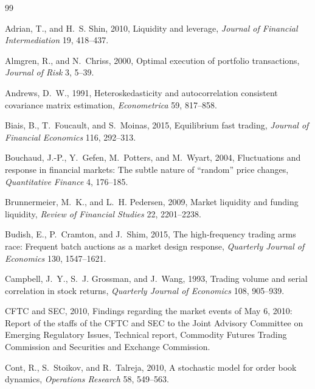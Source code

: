 \documentclass[12pt]{article}
\theoremstyle{definition}
\theoremstyle{remark}
\begin{document}
\begin{thebibliography}{99}
\small
\setlength{\itemsep}{0.0pt plus 0.3pt}
\setlength{\parsep}{0.0pt}

Adrian, T., and H.~S. Shin, 2010, Liquidity and leverage, \emph{Journal of Financial Intermediation} 19, 418--437.

Almgren, R., and N.~Chriss, 2000, Optimal execution of portfolio transactions, \emph{Journal of Risk} 3, 5--39.

Andrews, D.~W., 1991, Heteroskedasticity and autocorrelation consistent covariance matrix estimation, \emph{Econometrica} 59, 817--858.

Biais, B., T.~Foucault, and S.~Moinas, 2015, Equilibrium fast trading, \emph{Journal of Financial Economics} 116, 292--313.

Bouchaud, J.-P., Y.~Gefen, M.~Potters, and M.~Wyart, 2004, Fluctuations and response in financial markets: The subtle nature of ``random'' price changes, \emph{Quantitative Finance} 4, 176--185.

Brunnermeier, M.~K., and L.~H. Pedersen, 2009, Market liquidity and funding liquidity, \emph{Review of Financial Studies} 22, 2201--2238.

Budish, E., P.~Cramton, and J.~Shim, 2015, The high-frequency trading arms race: Frequent batch auctions as a market design response, \emph{Quarterly Journal of Economics} 130, 1547--1621.

Campbell, J.~Y., S.~J. Grossman, and J.~Wang, 1993, Trading volume and serial correlation in stock returns, \emph{Quarterly Journal of Economics} 108, 905--939.

CFTC and SEC, 2010, Findings regarding the market events of May 6, 2010: Report of the staffs of the CFTC and SEC to the Joint Advisory Committee on Emerging Regulatory Issues, Technical report, Commodity Futures Trading Commission and Securities and Exchange Commission.

Cont, R., S.~Stoikov, and R.~Talreja, 2010, A stochastic model for order book dynamics, \emph{Operations Research} 58, 549--563.


\end{thebibliography}
\end{document}
